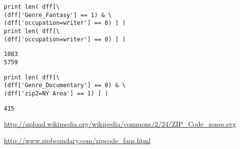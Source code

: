 \documentclass[12pt,fleqn]{article}\usepackage{../common}
\begin{document}
\begin{verbatim}
print len( dff[\
(dff['Genre_Fantasy'] == 1) & \
(dff['occupation=writer'] == 0) ] )
print len( dff[\
(dff['occupation=writer'] == 0) ] )
\end{verbatim}

\begin{verbatim}
1083
5759
\end{verbatim}

\begin{verbatim}
print len( dff[\
(dff['Genre_Documentary'] == 0) & \
(dff['zip2=NY Area'] == 1) ] )
\end{verbatim}

\begin{verbatim}
415
\end{verbatim}


\url{http://upload.wikimedia.org/wikipedia/commons/2/24/ZIP_Code_zones.svg}

\url{http://www.zipboundary.com/zipcode_faqs.html}
\end{document}
